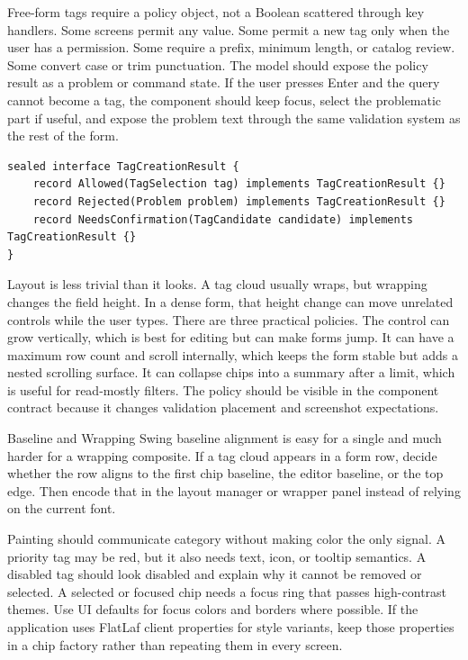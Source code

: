 Free-form tags require a policy object, not a Boolean scattered through key
handlers. Some screens permit any value. Some permit a new tag only when the user
has a permission. Some require a prefix, minimum length, or catalog review. Some
convert case or trim punctuation. The model should expose the policy result as a
problem or command state. If the user presses Enter and the query cannot become a
tag, the component should keep focus, select the problematic part if useful, and
expose the problem text through the same validation system as the rest of the
form.

\begin{lstlisting}[caption={Creation policy returns a domain result, not a UI decision.}]
sealed interface TagCreationResult {
    record Allowed(TagSelection tag) implements TagCreationResult {}
    record Rejected(Problem problem) implements TagCreationResult {}
    record NeedsConfirmation(TagCandidate candidate) implements TagCreationResult {}
}
\end{lstlisting}

Layout is less trivial than it looks. A tag cloud usually wraps, but wrapping
changes the field height. In a dense form, that height change can move unrelated
controls while the user types. There are three practical policies. The control
can grow vertically, which is best for editing but can make forms jump. It can
have a maximum row count and scroll internally, which keeps the form stable but
adds a nested scrolling surface. It can collapse chips into a summary after a
limit, which is useful for read-mostly filters. The policy should be visible in
the component contract because it changes validation placement and screenshot
expectations.

\begin{detailbox}{Baseline and Wrapping}
Swing baseline alignment is easy for a single  and much harder
for a wrapping composite. If a tag cloud appears in a form row, decide whether
the row aligns to the first chip baseline, the editor baseline, or the top edge.
Then encode that in the layout manager or wrapper panel instead of relying on
the current font.
\end{detailbox}

Painting should communicate category without making color the only signal. A
priority tag may be red, but it also needs text, icon, or tooltip semantics. A
disabled tag should look disabled and explain why it cannot be removed or
selected. A selected or focused chip needs a focus ring that passes high-contrast
themes. Use UI defaults for focus colors and borders where possible. If the
application uses FlatLaf client properties for style variants, keep those
properties in a chip factory rather than repeating them in every screen.

